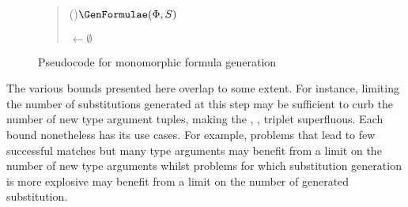 \documentclass[]{ceurart}
\begin{document}
\begin{figure}
\begin{quote}
\begin{algorithm}[H]
\Fn(){\(\GenFormulae(\Phi, S)\)}{




   \BlankLine

   \NewFormulae \(\leftarrow\emptyset\)\;

   \BlankLine


   \BlankLine

   \Return \NewFormulae
}
\end{algorithm}
\end{quote}
\caption{Pseudocode for monomorphic formula generation}
\label{gen_formulae}
\end{figure}


The various bounds presented here overlap to some extent. For instance, limiting the number of substitutions generated at this step may be sufficient to curb the number of new type argument tuples, making the \textcolor{ourblueviolet}{\MonoCap}, \textcolor{ourblueviolet}{\MonoMult}, \textcolor{ourblueviolet}{\MonoFloor} triplet superfluous. Each bound nonetheless has its use cases. For example, problems that lead to few successful matches but many type arguments may benefit from a limit on the number of new type arguments whilst problems for which substitution generation is more explosive may benefit from a limit on the number of generated substitution.
\end{document}
